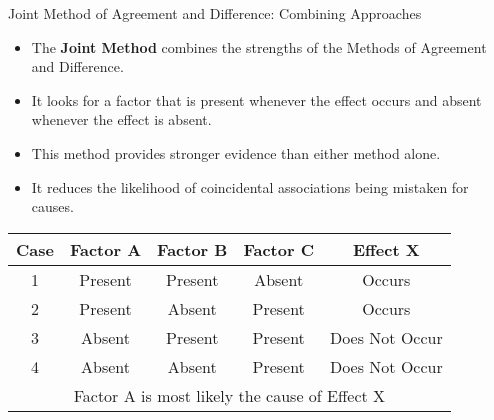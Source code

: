 \documentclass{beamer}
\begin{document}
\begin{frame}{Joint Method of Agreement and Difference: Combining Approaches}
	\begin{itemize}
		\item The \textbf{Joint Method} combines the strengths of the Methods of Agreement and Difference.
		\item It looks for a factor that is present whenever the effect occurs and absent whenever the effect is absent.
		\item This method provides stronger evidence than either method alone.
		\item It reduces the likelihood of coincidental associations being mistaken for causes.
	\end{itemize}
	
	\begin{table}
		\centering
		\begin{tabular}{|c|c|c|c|c|}
			\hline
			\textbf{Case} & \textbf{Factor A} & \textbf{Factor B} & \textbf{Factor C} & \textbf{Effect X} \\
			\hline
			1 & Present & Present & Absent & Occurs \\
			2 & Present & Absent & Present & Occurs \\
			3 & Absent & Present & Present & Does Not Occur \\
			4 & Absent & Absent & Present & Does Not Occur \\
			\hline
			\multicolumn{5}{|c|}{Factor A is most likely the cause of Effect X} \\
			\hline
		\end{tabular}
	\end{table}
\end{frame}
\end{document}

